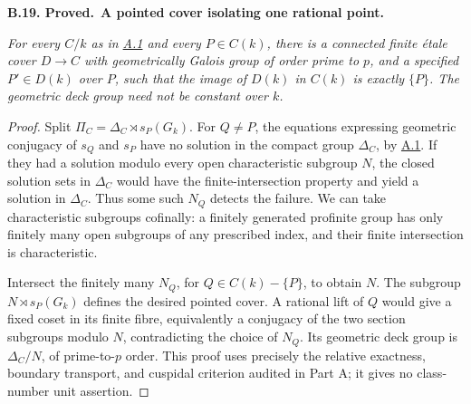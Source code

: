 \documentclass[11pt,a4paper]{article}
\newenvironment{claim}[3]{\par\medskip\noindent\hypertarget{#1}{\textbf{#1. #2.}}\ \textbf{#3.}\par\nopagebreak\smallskip\begingroup\itshape}{\endgroup\par\smallskip}
\newcommand{\statementref}[1]{\hyperlink{#1}{#1}}
\begin{document}
\begin{claim}{B.19}{Proved}{A pointed cover isolating one rational point}
For every $C/k$ as in \statementref{A.1} and every $P\in C(k)$,
there is a connected finite \emph{\'etale} cover $D\to C$ with
geometrically Galois group of order prime to $p$, and a specified
$P'\in D(k)$ over $P$, such that the image of $D(k)$ in $C(k)$ is
exactly $\{P\}$. The geometric deck group need not be constant over $k$.
\end{claim}
\begin{proof}
Split $\Pi_C=\Delta_C\rtimes s_P(G_k)$. For $Q\ne P$, the equations
expressing geometric conjugacy of $s_Q$ and $s_P$ have no solution
in the compact group $\Delta_C$, by \statementref{A.1}. If they had
a solution modulo every open characteristic subgroup $N$, the
closed solution sets in $\Delta_C$ would have the finite-intersection
property and yield a solution in $\Delta_C$. Thus some such $N_Q$
detects the failure. We can take characteristic subgroups cofinally:
a finitely generated profinite group has only finitely many open
subgroups of any prescribed index, and their finite intersection
is characteristic.

Intersect the finitely many $N_Q$, for $Q\in C(k)-\{P\}$, to obtain
$N$. The subgroup $N\rtimes s_P(G_k)$ defines the desired pointed
cover. A rational lift of $Q$ would give a fixed coset in its finite
fibre, equivalently a conjugacy of the two section subgroups modulo
$N$, contradicting the choice of $N_Q$. Its geometric deck group
is $\Delta_C/N$, of prime-to-$p$ order. This proof uses precisely
the relative exactness, boundary transport, and cuspidal criterion
audited in Part A; it gives no class-number unit assertion.
\end{proof}
\end{document}
